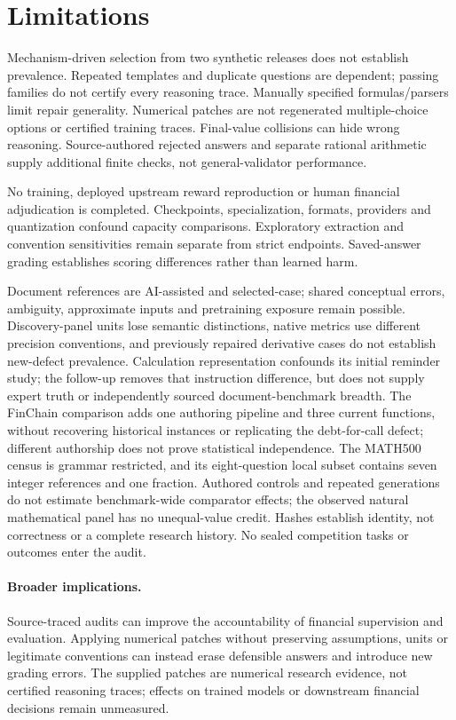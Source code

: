 \section{Limitations}
Mechanism-driven selection from two synthetic releases does not establish prevalence. Repeated templates and duplicate questions are dependent; passing families do not certify every reasoning trace. Manually specified formulas/parsers limit repair generality. Numerical patches are not regenerated multiple-choice options or certified training traces. Final-value collisions can hide wrong reasoning. Source-authored rejected answers and separate rational arithmetic supply additional finite checks, not general-validator performance.

No training, deployed upstream reward reproduction or human financial adjudication is completed. Checkpoints, specialization, formats, providers and quantization confound capacity comparisons. Exploratory extraction and convention sensitivities remain separate from strict endpoints. Saved-answer grading establishes scoring differences rather than learned harm.

Document references are AI-assisted and selected-case; shared conceptual errors, ambiguity, approximate inputs and pretraining exposure remain possible. Discovery-panel units lose semantic distinctions, native metrics use different precision conventions, and previously repaired derivative cases do not establish new-defect prevalence. Calculation representation confounds its initial reminder study; the follow-up removes that instruction difference, but does not supply expert truth or independently sourced document-benchmark breadth. The FinChain comparison adds one authoring pipeline and three current functions, without recovering historical instances or replicating the debt-for-call defect; different authorship does not prove statistical independence. The MATH500 census is grammar restricted, and its eight-question local subset contains seven integer references and one fraction. Authored controls and repeated generations do not estimate benchmark-wide comparator effects; the observed natural mathematical panel has no unequal-value credit. Hashes establish identity, not correctness or a complete research history. No sealed competition tasks or outcomes enter the audit.

\paragraph{Broader implications.} Source-traced audits can improve the accountability of financial supervision and evaluation. Applying numerical patches without preserving assumptions, units or legitimate conventions can instead erase defensible answers and introduce new grading errors. The supplied patches are numerical research evidence, not certified reasoning traces; effects on trained models or downstream financial decisions remain unmeasured.

